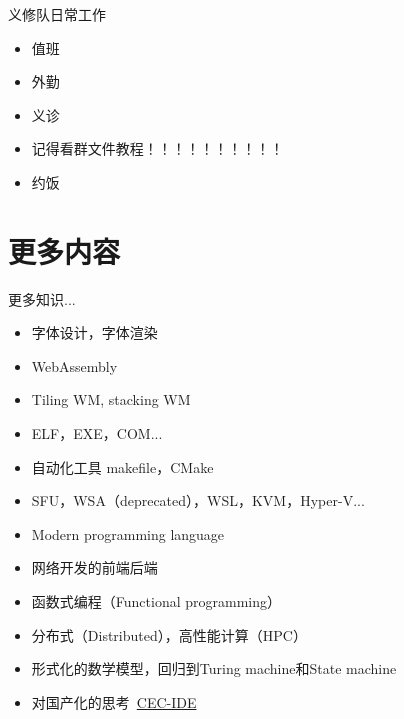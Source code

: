 \documentclass[aspectratio=1610]{beamer}
\begin{document}
\begin{frame}{义修队日常工作}
    \begin{itemize}
        \item 值班
        \item 外勤
        \item 义诊
        \item 记得看群文件教程！！！！！！！！！！
        \item 约饭
    \end{itemize}
\end{frame}

\section{更多内容}

\begin{frame}{更多知识...}
    \begin{itemize}
        \item 字体设计，字体渲染
        \item WebAssembly
        \item Tiling WM, stacking WM
        \item ELF，EXE，COM...
        \item 自动化工具 makefile，CMake
        \item SFU，WSA（deprecated），WSL，KVM，Hyper-V...
        \item Modern programming language
        \item 网络开发的前端后端
        \item 函数式编程（Functional programming）
        \item 分布式（Distributed），高性能计算（HPC）
        \item 形式化的数学模型，回归到Turing machine和State machine
        \item 对国产化的思考\ \href{https://github.com/microsoft/vscode/issues/191229}{CEC-IDE}
    \end{itemize}
\end{frame}
\end{document}
